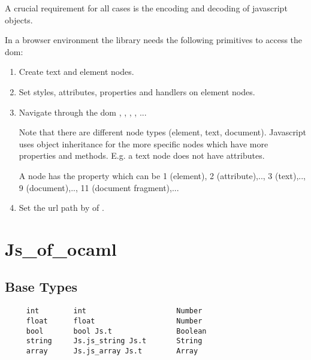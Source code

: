 A crucial requirement for all cases is the encoding and decoding of javascript
objects.


In a browser environment the library needs the following primitives to access
the dom:


\begin{enumerate}

\item Create text and element nodes.

\item Set styles, attributes, properties and handlers on element nodes.

\item Navigate through the dom , ,
, , ...

    Note that there are different node types (element, text, document).
    Javascript uses object inheritance for the more specific nodes which have
    more properties and methods. E.g. a text node does not have attributes.

    A node has the property  which can be 1 (element), 2
    (attribute),.., 3 (text),.., 9 (document),.., 11 (document fragment),...


\item Set the url path by  of
.


\end{enumerate}










\section{Js\_of\_ocaml}



\subsection{Base Types}

{\small
\begin{verbatim}
     int        int                     Number
     float      float                   Number
     bool       bool Js.t               Boolean
     string     Js.js_string Js.t       String
     array      Js.js_array Js.t        Array
\end{verbatim}
}


